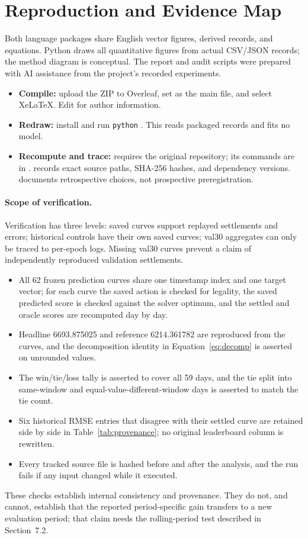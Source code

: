 \documentclass[11pt,a4paper]{article}
\begin{document}
\section{Reproduction and Evidence Map}
\small
Both language packages share English vector figures, derived records, and equations. Python draws all quantitative figures from actual CSV/JSON records; the method diagram is conceptual. The report and audit scripts were prepared with AI assistance from the project's recorded experiments.

\begin{itemize}\small\raggedright
\item \textbf{Compile:} upload the ZIP to Overleaf, set  as the main file, and select XeLaTeX. Edit  for author information.
\item \textbf{Redraw:} install  and run \texttt{python} . This reads packaged records and fits no model.
\item \textbf{Recompute and trace:}  requires the original repository; its commands are in .  records exact source paths, SHA-256 hashes, and dependency versions.  documents retrospective choices, not prospective preregistration.
\end{itemize}

\paragraph{Scope of verification.}
Verification has three levels: saved curves support replayed settlements and errors; historical controls have their own saved curves; val30 aggregates can only be traced to per-epoch logs. Missing val30 curves prevent a claim of independently reproduced validation settlements.

\begin{itemize}\small\raggedright
\item All 62 frozen prediction curves share one timestamp index and one target vector; for each curve the saved action is checked for legality, the saved predicted score is checked against the solver optimum, and the settled and oracle scores are recomputed day by day.
\item Headline 6693.875025 and reference 6214.361782 are reproduced from the curves, and the decomposition identity in Equation~\eqref{eq:decomp} is asserted on unrounded values.
\item The win/tie/loss tally is asserted to cover all 59 days, and the tie split into same-window and equal-value-different-window days is asserted to match the tie count.
\item Six historical RMSE entries that disagree with their settled curve are retained side by side in Table~\ref{tab:provenance}; no original leaderboard column is rewritten.
\item Every tracked source file is hashed before and after the analysis, and the run fails if any input changed while it executed.
\end{itemize}

These checks establish internal consistency and provenance. They do not, and cannot, establish that the reported period-specific gain transfers to a new evaluation period; that claim needs the rolling-period test described in Section~7.2.
\end{document}
